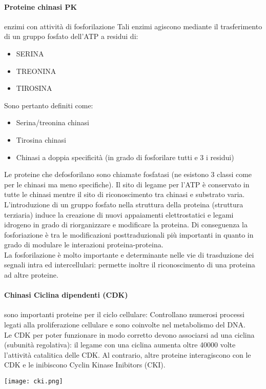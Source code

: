 \documentclass{article}
\begin{document}
\paragraph{Proteine chinasi PK} enzimi con attività di fosforilazione
Tali enzimi agiscono mediante il trasferimento di un gruppo fosfato dell'ATP a residui di:
\begin{itemize}
    \item SERINA
    \item TREONINA
    \item TIROSINA
\end{itemize}
Sono pertanto definiti come:
\begin{itemize}
    \item Serina/treonina chinasi
    \item Tirosina chinasi
    \item Chinasi a doppia specificità (in grado di fosforilare tutti e 3 i residui)
\end{itemize}
Le proteine che defosforilano sono chiamate fosfatasi (ne esistono 3 classi come per le chinasi ma
meno specifiche). Il sito di legame per l'ATP è conservato in tutte le chinasi mentre il sito di riconoscimento tra chinasi e
substrato varia. L'introduzione di un gruppo fosfato nella struttura della proteina
(struttura terziaria) induce la creazione di nuovi appaiamenti elettrostatici
e legami idrogeno in grado di riorganizzare e modificare la proteina. Di conseguenza la fosforiazione è tra le modificazioni
posttraduzionali più importanti in quanto in grado di modulare le
interazioni proteina-proteina.\\
La fosforilazione è molto importante e determinante nelle vie di trasduzione dei segnali intra ed intercellulari: 
permette inoltre il riconoscimento di una proteina ad altre proteine.
\paragraph{Chinasi Ciclina dipendenti (CDK)} 
sono importanti proteine per il ciclo cellulare: Controllano numerosi processi legati alla proliferazione cellulare e sono coinvolte nel metabolismo del DNA.\\
Le CDK per poter funzionare in modo corretto devono associarsi ad una ciclina (subunità regolativa): il legame con
una ciclina aumenta oltre 40000 volte l'attività catalitica
delle CDK. Al contrario, altre proteine interagiscono con le CDK e le inibiscono Cyclin Kinase Inibitors (CKI).
\begin{center}
    \texttt{[image: cki.png]}
\end{center}
\end{document}
